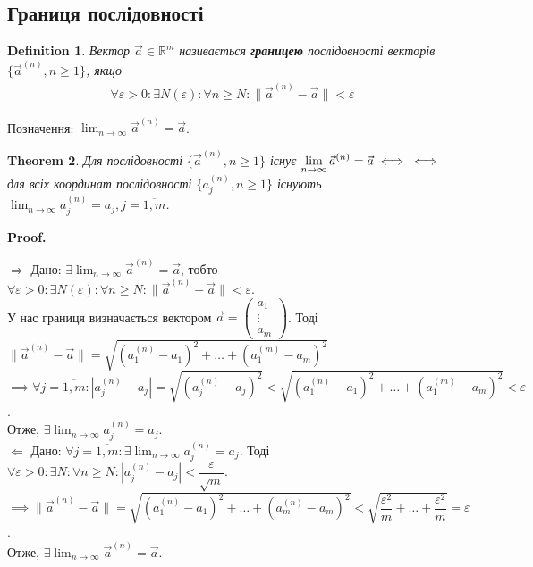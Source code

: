 \documentclass[a4paper, 10pt]{article}
\makeatletter
\def\huge{\displaystyle}
\def\rightproof{$\boxed{\Rightarrow}$ }
\def\leftproof{$\boxed{\Leftarrow}$ }
\theoremstyle{theoremdd}
\newtheorem{theorem}{Theorem}[subsection]
\theoremstyle{theoremdd}
\theoremstyle{theoremdd}
\newtheorem{definition}[theorem]{Definition}
\theoremstyle{theoremdd}
\theoremstyle{theoremdd}
\theoremstyle{theoremdd}
\theoremstyle{theoremdd}
\theoremstyle{theoremdd}
\theoremstyle{theoremdd}
\renewenvironment{proof}[1][Proof.\\]{\par
\pushQED{\hfill \qed}%
\normalfont \topsep6\p@\@plus6\p@\relax
\trivlist
\item\relax
{\bfseries
#1\@addpunct{.}}\hspace\labelsep\ignorespaces
}{%
\popQED\endtrivlist\@endpefalse
}
\newcommand\Norm[1]{\|#1\|}
\makeatother
\begin{document}
\subsection{Границя послідовності}
\begin{definition}
Вектор $\vec{a} \in \mathbb{R}^m$ називається \textbf{границею} послідовності векторів $\{\vec{a}^{(n)}, n \geq 1 \}$, якщо
\begin{align*}
\forall \varepsilon > 0: \exists N(\varepsilon): \forall n \geq N: \Norm{\vec{a}^{(n)} - \vec{a}} < \varepsilon
\end{align*}
\end{definition}
Позначення: $\huge \lim_{n \to \infty} \vec{a}^{(n)} = \vec{a}$.

\begin{theorem}
Для послідовності $\{\vec{a}^{(n)}, n \geq 1 \}$ існує $\huge \lim_{n \to \infty} \vec{a}^{(n)} = \vec{a} \iff \\ \iff$ для всіх координат послідовності $\{a_j^{(n)}, n \geq 1\}$ існують $\huge \lim_{n \to \infty} a_j^{(n)} = a_j, j = \overline{1,m}$.
\end{theorem}

\begin{proof}
\rightproof Дано: $\exists \huge \lim_{n \to \infty} \vec{a}^{(n)} = \vec{a}$, тобто $\huge \forall \varepsilon > 0: \exists N(\varepsilon): \forall n \geq N: \|\vec{a}^{(n)} - \vec{a}\| < \varepsilon$.\\
У нас границя визначається вектором $\vec{a} = \begin{pmatrix}
a_1 \\ \vdots \\ a_m
\end{pmatrix}$. Тоді 
$\Norm{\vec{a}^{(n)} - \vec{a}} = \sqrt{(a_1^{(n)} - a_1)^2 + \dots + (a_1^{(m)} - a_m)^2}$\\
$\implies \forall j = \overline{1,m}: |a_j^{(n)} - a_j| = \sqrt{(a_j^{(n)} - a_j)^2} < \sqrt{(a_1^{(n)} - a_1)^2 + \dots + (a_1^{(m)} - a_m)^2} < \varepsilon$.\\
Отже, $\exists \huge \lim_{n \to \infty} a_j^{(n)} = a_j$.
\bigskip \\
\leftproof Дано: $\forall j = \overline{1,m}: \exists \huge \lim_{n \to \infty} a_j^{(n)} = a_j$. Тоді $\forall \varepsilon > 0: \exists N: \forall n \geq N: |a_j^{(n)} - a_j| < \dfrac{\varepsilon}{\sqrt{m}}$.\\
$\implies \Norm{\vec{a}^{(n)} - \vec{a}} = \sqrt{(a_1^{(n)} - a_1)^2 + \dots + (a_m^{(n)} - a_m)^2} < \sqrt{\dfrac{\varepsilon^2}{m} + \dots + \dfrac{\varepsilon^2}{m}} = \varepsilon$.\\
Отже, $\exists \huge \lim_{n \to \infty} \vec{a}^{(n)} = \vec{a}$.
\end{proof}
\end{document}
